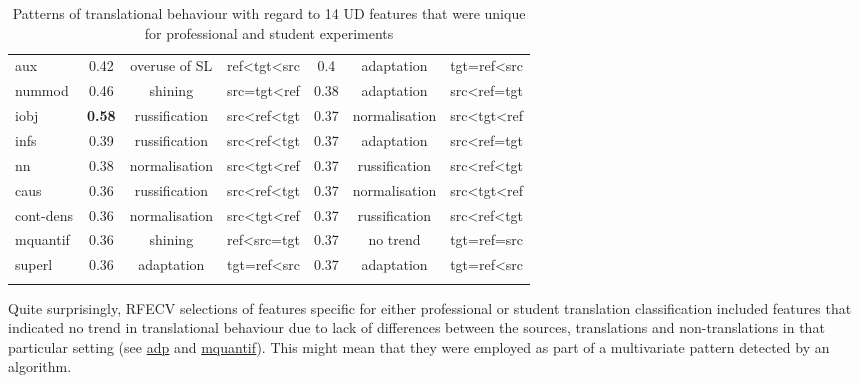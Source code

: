 \begin{longtable}[H]{p{1.84cm}|ccc||ccc}
	aux           & 0.42 & overuse of SL & ref\textless{}tgt\textless{}src & 0.4  & adaptation    & tgt=ref\textless{}src           \\
	nummod        & 0.46 & shining       & src=tgt\textless{}ref           & 0.38 & adaptation    & src\textless{}ref=tgt           \\
	iobj          & \textbf{0.58} & russification & src\textless{}ref\textless{}tgt & 0.37 & normalisation & src\textless{}tgt\textless{}ref \\
	infs          & 0.39 & russification & src\textless{}ref\textless{}tgt & 0.37 & adaptation    & src\textless{}ref=tgt           \\
	nn            & 0.38 & normalisation & src\textless{}tgt\textless{}ref & 0.37 & russification & src\textless{}ref\textless{}tgt \\
	caus          & 0.36 & russification & src\textless{}ref\textless{}tgt & 0.37 & normalisation & src\textless{}tgt\textless{}ref \\
	cont-dens & 0.36 & normalisation & src\textless{}tgt\textless{}ref & 0.37 & russification & src\textless{}ref\textless{}tgt \\
	mquantif      & 0.36 & shining       & ref\textless{}src=tgt           & 0.37 & no trend       & tgt=ref=src                     \\
	superl        & 0.36 & adaptation    & tgt=ref\textless{}src           & 0.37 & adaptation    & tgt=ref\textless{}src  \\
	\bottomrule
	\caption{\label{tab:spec_rfecv_feats}Patterns of translational behaviour with regard to 14 UD features that were unique for professional and student experiments}\\
\end{longtable}	

Quite surprisingly, RFECV selections of features specific for either professional or student translation classification included features that indicated no trend in translational behaviour due to lack of differences between the sources, translations and non-translations in that particular setting (see \hyperlink{ft:adp}{adp} and \hyperlink{ft:mquantif}{mquantif}). This might mean that they were employed as part of a multivariate pattern detected by an algorithm.

